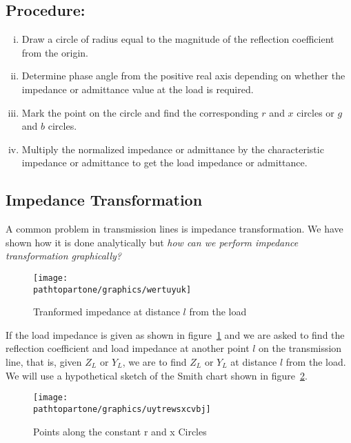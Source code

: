 \subsection*{Procedure:}
\begin{enumerate}[(i)]
\item Draw a circle of radius equal to the magnitude of the reflection coefficient from the origin.
\item Determine phase angle from the positive real axis depending on whether the impedance or admittance value at the load is required.
\item Mark the point on the circle and find the corresponding $r$ and $x$ circles or $g$ and $b$ circles.
\item Multiply the normalized impedance or admittance by the characteristic impedance or admittance to get the load impedance or admittance.
\end{enumerate}

\subsection{Impedance Transformation}
A common problem in transmission lines is impedance transformation. We have shown how it is done analytically but \emph{how can we perform impedance transformation graphically?} 
\begin{figure}[h]
\centering
\texttt{[image: \\pathtopartone/graphics/wertuyuk]}
\caption{Tranformed impedance at distance $l$ from the load}
\label{fig:wertuyuk}
\end{figure}

If the load impedance is given as shown in figure~\ref{fig:wertuyuk} and we are asked to find the reflection coefficient and load impedance at another point $l$ on the transmission line, that is, given $Z_L$ or $Y_L$, we are to find $Z_L$ or $Y_L$ at distance $l$ from the load. We will use a hypothetical sketch of the Smith chart shown in figure~\ref{fig:uytrewsxcvbj}.
\begin{figure}[h]
\centering
\texttt{[image: \\pathtopartone/graphics/uytrewsxcvbj]}
\caption{Points along the constant r and x Circles}
\label{fig:uytrewsxcvbj}
\end{figure}

